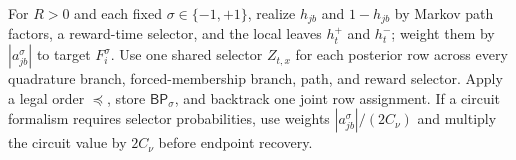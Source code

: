 For \(R>0\) and each fixed \(\sigma\in\{-1,+1\}\), realize \(h_{jb}\) and \(1-h_{jb}\) by Markov path factors, a reward-time selector, and the local leaves \(h_t^{+}\) and \(h_t^{-}\); weight them by \(|a_{jb}^{\sigma}|\) to target \(F_i^{\sigma}\). Use one shared selector \(Z_{t,x}\) for each posterior row across every quadrature branch, forced-membership branch, path, and reward selector. Apply a legal order \(\preceq\), store \(\mathsf{BP}_{\sigma}\), and backtrack one joint row assignment. If a circuit formalism requires selector probabilities, use weights \(|a_{jb}^{\sigma}|/(2C_{\nu})\) and multiply the circuit value by \(2C_{\nu}\) before endpoint recovery.